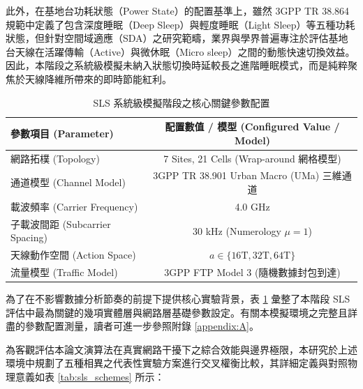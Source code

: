 此外，在基地台功耗狀態（Power State）的配置基準上，雖然 3GPP TR 38.864 規範中定義了包含深度睡眠（Deep Sleep）與輕度睡眠（Light Sleep）等五種功耗狀態，但針對空間域適應（SDA）之研究範疇，業界與學界普遍專注於評估基地台天線在活躍傳輸（Active）與微休眠（Micro sleep）之間的動態快速切換效益。因此，本階段之系統級模擬未納入狀態切換時延較長之進階睡眠模式，而是純粹聚焦於天線降維所帶來的即時節能紅利。

\begin{table}[htbp]
\centering
\caption{SLS 系統級模擬階段之核心關鍵參數配置}
\label{tab:sls_key_parameters}
\renewcommand{\arraystretch}{1.2}
\begin{tabular}{lc}
\hline
\textbf{參數項目 (Parameter)} & \textbf{配置數值 / 模型 (Configured Value / Model)} \\ \hline
網路拓樸 (Topology)         & 7 Sites, 21 Cells (Wrap-around 網格模型)             \\
通道模型 (Channel Model)  & 3GPP TR 38.901 Urban Macro (UMa) 三維通道              \\
載波頻率 (Carrier Frequency)   & 4.0 GHz                                               \\
子載波間距 (Subcarrier Spacing) & 30 kHz (Numerology $\mu = 1$)                         \\
天線動作空間 (Action Space)     & $a \in \{16\text{T}, 32\text{T}, 64\text{T}\}$         \\
流量模型 (Traffic Model) & 3GPP FTP Model 3 (隨機數據封包到達)                   \\ \hline
\end{tabular}
\end{table}

為了在不影響數據分析節奏的前提下提供核心實驗背景，表 \ref{tab:sls_key_parameters} 彙整了本階段 SLS 評估中最為關鍵的幾項實體層與網路層基礎參數設定。有關本模擬環境之完整且詳盡的參數配置測量，讀者可進一步參照附錄 \ref{appendix:A}。

為客觀評估本論文演算法在真實網路干擾下之綜合效能與邊界極限，本研究於上述環境中規劃了五種相異之代表性實驗方案進行交叉權衡比較，其詳細定義與對照物理意義如表 \ref{tab:sls_schemes} 所示：

